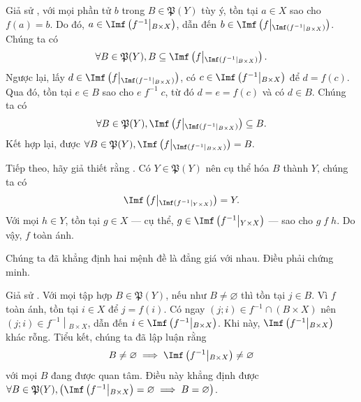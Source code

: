 \solution

\resetSubexercise Giả sử , với mọi phần tử $b$ trong $B \in \mathfrak{P}(Y)$ tùy ý, tồn tại $a \in X$ sao cho $f(a) = b$. Do đó, $a \in \Imf\left(f^{-1}\middle|_{B \times X}\right)$, dẫn đến $b \in \Imf\left(f\middle|_{\Imf\left(f^{-1}\middle|_{B \times X}\right)}\right)$. Chúng ta có \begin{equation*}
   \forall B \in \mathfrak{P}(Y), B \subseteq \Imf\left(f\middle|_{\Imf\left(f^{-1}\middle|_{B \times X}\right)}\right).
\end{equation*}
Ngược lại, lấy $d \in \Imf\left(f\middle|_{\Imf\left(f^{-1}\middle|_{B \times X}\right)}\right)$, có $c \in \Imf\left(f^{-1}\middle|_{B \times X}\right)$ để $d = f(c)$. Qua đó, tồn tại $e \in B$ sao cho $e\;f^{-1}\;c$, từ đó $d = e = f(c)$ và có $d \in B$. Chúng ta có \begin{equation*}
   \forall B \in \mathfrak{P}(Y), \Imf\left(f\middle|_{\Imf\left(f^{-1}\middle|_{B \times X}\right)}\right) \subseteq B.
\end{equation*}
Kết hợp lại, được $\forall B \in \mathfrak{P}(Y), \Imf\left(f\middle|_{\Imf\left(f^{-1}\middle|_{B \times X}\right)}\right) = B.$

Tiếp theo, hãy giả thiết rằng . Có $Y \in \mathfrak{P}(Y)$ nên cụ thể hóa $B$ thành $Y$, chúng ta có \begin{equation*}
   \Imf\left(f\middle|_{\Imf\left(f^{-1}\middle|_{Y \times X}\right)}\right) = Y.
\end{equation*}
Với mọi $h \in Y$, tồn tại $g \in X$ --- cụ thể, $g \in \Imf\left(f^{-1}\middle|_{Y \times X}\right)$ --- sao cho $g\;f\;h$. Do vậy, $f$ toàn ánh.

Chúng ta đã khẳng định hai mệnh đề là đẳng giá với nhau. Điều phải chứng minh.

\stepSubexercise Giả sử . Với mọi tập hợp $B \in \mathfrak{P}(Y)$, nếu như $B \neq \varnothing$ thì tồn tại $j \in B$. Vì $f$ toàn ánh, tồn tại $i \in X$ để $j = f(i)$. Có ngay $(j; i) \in f^{-1} \cap (B \times X)$ nên $(j; i) \in \left.f^{-1}\middle|_{B \times X}\right.$, dẫn đến $i \in \Imf\left(f^{-1}\middle|_{B \times X}\right)$. Khi này, $\Imf\left(f^{-1}\middle|_{B \times X}\right)$ khác rỗng. Tiểu kết, chúng ta đã lập luận rằng $$B \neq \varnothing \implies \Imf\left(f^{-1}\middle|_{B \times X}\right) \neq \varnothing$$ với mọi $B$ đang được quan tâm. Điều này khẳng định được $\forall B \in \mathfrak{P}(Y), \left(\Imf\left(f^{-1}\middle|_{B \times X}\right) = \varnothing \implies B = \varnothing\right)$.

